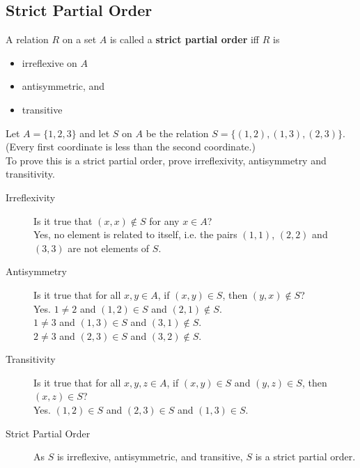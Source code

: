 \documentclass[../notes.tex]{subfiles}
\begin{document}
			\subsection{Strict Partial Order}
				A relation $R$ on a set $A$ is called a \textbf{strict partial order} iff $R$ is
				\begin{itemize}[nosep]
					\item irreflexive on $A$
					\item antisymmetric, and
					\item transitive
				\end{itemize}
				\begin{example}
					Let $A = \{1, 2, 3\}$ and let $S$ on $A$ be the relation $S = \bigl\{(1, 2), (1, 3), (2, 3)\bigr\}$. (Every first coordinate is less than the second coordinate.)\\
					To prove this is a strict partial order, prove irreflexivity, antisymmetry and transitivity.
					\begin{description}
						\item[Irreflexivity] Is it true that $(x, x) \notin S$ for any $x \in A$?\\
							Yes, no element is related to itself, i.e. the pairs $(1, 1)$, $(2, 2)$ and $(3, 3)$ are not elements of $S$.
						\item[Antisymmetry] Is it true that for all $x, y \in A$, if $(x, y) \in S$, then $(y, x) \notin S$?\\
							Yes. $1 \neq 2$ and $(1, 2) \in S$ and $(2, 1) \notin S$.\\
							$1 \neq 3$ and $(1, 3) \in S$ and $(3, 1) \notin S$.\\
							$2 \neq 3$ and $(2, 3) \in S$ and $(3, 2) \notin S$.
						\item[Transitivity] Is it true that for all $x, y, z \in A$, if $(x, y) \in S$ and $(y, z) \in S$, then $(x, z) \in S$?\\
							Yes. $(1, 2) \in S$ and $(2, 3) \in S$ and $(1, 3) \in S$.
						\item[Strict Partial Order] As $S$ is irreflexive, antisymmetric, and transitive, $S$ is a strict partial order.
					\end{description}
				\end{example}
\end{document}
